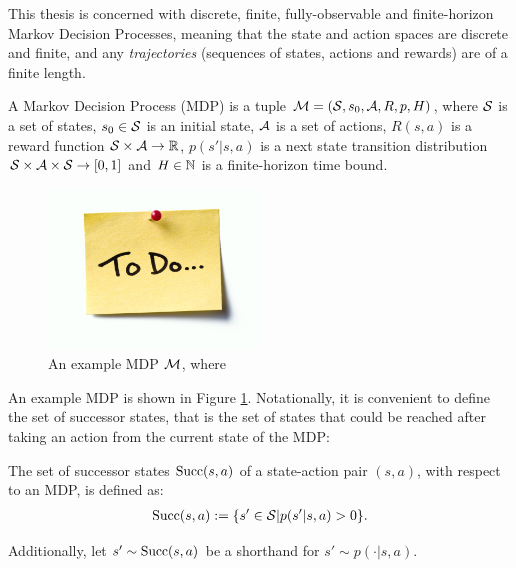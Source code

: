     This thesis is concerned with discrete, finite, fully-observable and finite-horizon Markov Decision Processes, meaning that the state and action spaces are discrete and finite, and any \textit{trajectories} (sequences of states, actions and rewards) are of a finite length. 

    \begin{defn}
        \label{def:mdp}
        A \textnormal{Markov Decision Process} (MDP) is a tuple $\mathcal{M}=(\mathcal{S},s_0,\mathcal{A},R,p,H)$, where $\mathcal{S}$ is a set of states, $s_0\in\mathcal{S}$ is an initial state, $\mathcal{A}$ is a set of actions, $R(s,a)$ is a reward function $\mathcal{S}\times \mathcal{A}\rightarrow \mathbb{R}$, $p(s' | s,a)$ is a next state transition distribution $\mathcal{S} \times \mathcal{A} \times \mathcal{S} \rightarrow [0,1]$ and $H\in\mathbb{N}$ is a finite-horizon time bound. 
    \end{defn}

    \begin{figure}
        \centering\includegraphics[width=0.5\textwidth]{figures/todo.jpg} 
        \caption[An example MDP $\cl{M}$.]{An example MDP $\cl{M}$, where }
        \label{fig:mdp_eg}
    \end{figure}

    An example MDP is shown in Figure \ref{fig:mdp_eg}. Notationally, it is convenient to define the set of successor states, that is the set of states that could be reached after taking an action from the current state of the MDP:
    \begin{defn}
        \label{def:succ}
        The set of \textnormal{successor states} ${\textnormal{Succ}(s,a)}$ of a state-action pair $(s,a)$, with respect to an MDP, is defined as: 
        \begin{align}
            {\textnormal{Succ}(s,a)}:=\{s'\in\mathcal{S}|p(s'|s,a)>0\}. \label{eq:succ_def}
        \end{align}
        
        Additionally, let $s'\sim {\textnormal{Succ}(s,a)}$ be a shorthand for $s'\sim p(\cdot|s,a)$.
    \end{defn}

